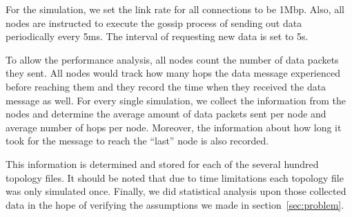 For the simulation, we set the link rate for all connections to be 1Mbp. Also, all nodes are instructed to execute the gossip process of sending out data periodically every 5ms. The interval of requesting new data is set to 5s.

To allow the performance analysis, all nodes count the number of data packets they sent. All nodes would track how many hops the data message experienced before reaching them and they record the time when they received the data message as well. For every single simulation, we collect the information from the nodes and determine the average amount of data packets sent per node and average number of hops per node. Moreover, the information about how long it took for the message to reach the ``last'' node is also recorded.

This information is determined and stored for each of the several hundred topology files. It should be noted that due to time limitations each topology file was only simulated once. Finally, we did statistical analysis upon those collected data in the hope of verifying the assumptions we made in section~\ref{sec:problem}.

